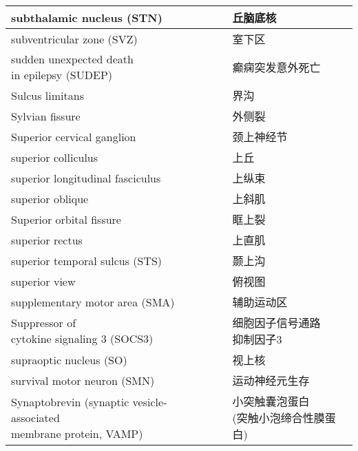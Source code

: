 \begin{longtable}{lll}
	\midrule
	subthalamic nucleus (STN)   && 丘脑底核 \\
	
	\midrule
	subventricular zone (SVZ)   && 室下区 \\
	
	\midrule
	\makecell{sudden unexpected death \\in epilepsy (SUDEP)}  && 癫痫突发意外死亡 \\
	
	\midrule
	Sulcus limitans   && 界沟 \\
	
	\midrule
	Sylvian fissure   && 外侧裂 \\
	
	\midrule
	Superior cervical ganglion   && 颈上神经节 \\
	
	\midrule
	superior colliculus   && 上丘 \\
	
	\midrule
	superior longitudinal fasciculus   && 上纵束 \\
	
	\midrule
	superior oblique   && 上斜肌 \\
	
	\midrule
	Superior orbital fissure   && 眶上裂 \\
	
	\midrule
	superior rectus   && 上直肌 \\
	
	\midrule
	superior temporal sulcus (STS)   && 颞上沟 \\
	
	\midrule
	superior view   && 俯视图 \\
	
	\midrule
	supplementary motor area (SMA)   && 辅助运动区 \\
	
	\midrule
	\makecell{Suppressor of \\cytokine signaling 3 (SOCS3)}  && \makecell{细胞因子信号通路\\抑制因子3} \\
	
	\midrule
	supraoptic nucleus (SO)  && 视上核 \\
	
	\midrule
	survival motor neuron (SMN) && 运动神经元生存 \\
	
	\midrule
	\makecell{Synaptobrevin (synaptic vesicle-associated\\ membrane protein, VAMP)}   && \makecell{小突触囊泡蛋白\\ (突触小泡缔合性膜蛋白)} \\
	

\end{longtable}
